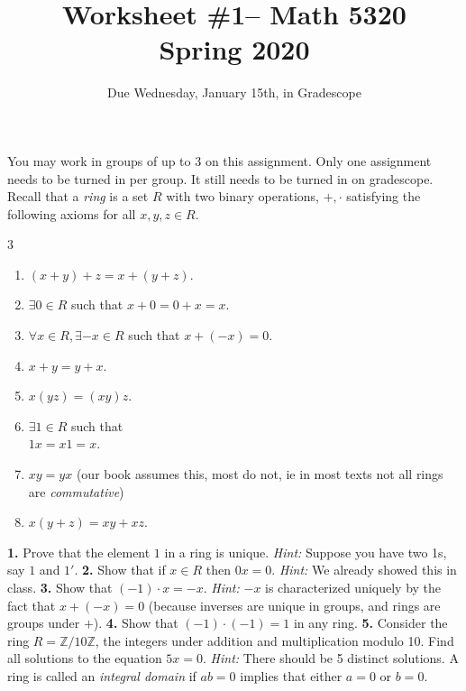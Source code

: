 \documentclass[10pt]{amsart}
\theoremstyle{theorem}
\newcommand{\bZ}{\mathbb{Z}}
\begin{document}
\title{Worksheet \#1-- Math 5320\\Spring 2020}
\author{Due Wednesday, January 15th, in Gradescope}

\maketitle
You may work in groups of up to 3 on this assignment.  Only one assignment needs to be turned in per group.  It still needs to be turned in on gradescope.
\vskip 9pt
Recall that a \emph{ring} is a set $R$ with two binary operations, $+, \cdot$ satisfying the following axioms for all $x,y,z \in R$.
\begin{multicols}{3}
    \begin{enumerate}
    \item $(x+y) + z = x+ (y+z)$.
    \item $\exists 0 \in R$ such that $x + 0 = 0 + x = x$.    
    \item $\forall x \in R, \exists -x \in R$ such that $x + (-x) = 0$.
    \item $x+y = y+x$.
    \item $x(yz) = (xy)z$.
    \item $\exists 1 \in R$ such that \\$1 x = x1 = x.$
    \item $xy = yx$ (our book assumes this, most do not, ie in most texts not all rings are \emph{commutative})
    \item $x(y+z) = xy + xz$.
    \end{enumerate}
    \end{multicols}
\noindent
{\bf 1.}  Prove that the element $1$ in a ring is unique.
\vskip 3pt
\emph{Hint:}  Suppose you have two 1s, say $1$ and $1'$.
\vskip 130pt
\noindent
{\bf 2.}  Show that if $x \in R$ then $0x = 0$.
\vskip 3pt
\emph{Hint:} We already showed this in class. 
\newpage
\noindent
{\bf 3.}  Show that $(-1) \cdot x = -x$.
\vskip 3pt
\emph{Hint:}  $-x$ is characterized uniquely by the fact that $x + (-x) = 0$ (because inverses are unique in groups, and rings are groups under $+$).
\vskip 130pt
\noindent
{\bf 4.}  Show that $(-1) \cdot (-1) = 1$ in any ring.
\vskip 130pt
\noindent
{\bf 5.}  Consider the ring $R = \bZ/10\bZ$, the integers under addition and multiplication modulo 10.  Find all solutions to the equation $5x = 0$.  
\vskip 3pt
\emph{Hint: }  There should be 5 distinct solutions.
\vskip 130pt
A ring is called an \emph{integral domain} if $ab = 0$ implies that either $a = 0$ or $b = 0$.
\vskip 3pt
\noindent
\end{document}
